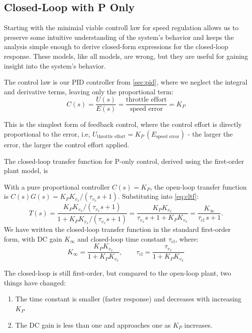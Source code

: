 \documentclass[12pt]{article}
\begin{document}
\subsection{Closed-Loop with P Only}

Starting with the minimial viable controll law for speed regulation allows us to preserve some intuitive understanding of the system's behavior and keeps the analysis simple enough to derive closed-form expressions for the closed-loop response.    These models, like all models, are wrong, but they are useful for gaining insight into the system's behavior.

The control law is our PID controller from \cref{sec:pid}, where we neglect the integral and derivative terms, leaving only the proportional term:
\[
C(s) = \frac{U(s)}{E(s)} = \frac{\text{throttle effort}}{\text{speed error}} = K_P
\]

This is the simplest form of feedback control, where the control effort is directly proportional to the error, i.e, $U_\text{throttle effort} = K_P \, (E_\text{speed error})$ - the larger the error, the larger the control effort applied.

The closed-loop transfer function for P-only control, derived using the first-order plant model, is



With a pure proportional controller $C(s) = K_P$, the open-loop transfer
function is $C(s)G(s) = K_P K_{v_x}/(\tau_{v_x} s + 1)$.  Substituting into
\cref{eq:cltf}:
\begin{equation}
  T(s) = \frac{K_P K_{v_x}/(\tau_{v_x} s+1)}{1 + K_P K_{v_x}/(\tau_{v_x} s+1)}
          = \frac{K_P K_{v_x}}{\tau_{v_x} s + 1 + K_P K_{v_x}}
          = \frac{K_\infty}{\tau_\mathrm{cl}\,s + 1}.
  \label{eq:cl_p}
\end{equation}
We have written the closed-loop transfer function in the standard first-order form, with DC gain $K_\infty$ and closed-loop time constant $\tau_\mathrm{cl}$, where:
\begin{equation}
  K_\infty = \frac{K_P K_{v_x}}{1 + K_P K_{v_x}}, \qquad
  \tau_\mathrm{cl} = \frac{\tau_{v_x}}{1 + K_P K_{v_x}}
  \label{eq:p_params}
\end{equation}

The closed-loop is still first-order, but compared to the open-loop plant, two things have
changed: 

\begin{enumerate}
\item The time constant is smaller (faster response) and decreases with increasing $K_P$
\item The DC gain is less than one and approaches one as $K_P$ increases.
\end{enumerate}
\end{document}
